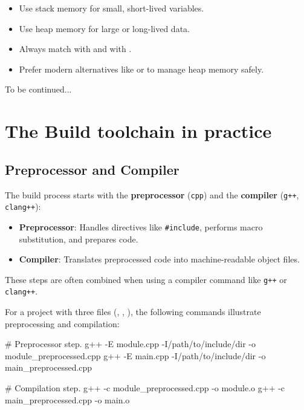\begin{tipsblock}
    \begin{itemize}
        \item Use stack memory for small, short-lived variables.
        \item Use heap memory for large or long-lived data.
        \item Always match  with  and  with .
        \item Prefer modern alternatives like  or  to manage heap memory safely.
    \end{itemize}
\end{tipsblock}

\Large To be continued... \normalsize

\newpage

\section{The Build toolchain in practice}

\subsection{Preprocessor and Compiler}

The build process starts with the \textbf{preprocessor} (\texttt{cpp}) and the \textbf{compiler} (\texttt{g++}, \texttt{clang++}):
\begin{itemize}
    \item \textbf{Preprocessor}: Handles directives like \texttt{\#include}, performs macro substitution, and prepares code.
    \item \textbf{Compiler}: Translates preprocessed code into machine-readable object files.
    \end{itemize}

These steps are often combined when using a compiler command like \texttt{g++} or \texttt{clang++}.

\begin{exampleblock}
    For a project with three files (, , ), the following commands illustrate preprocessing and compilation:
    
    \begin{codeblock}[language=bash, numbers=none]
# Preprocessor step.
g++ -E module.cpp -I/path/to/include/dir -o module_preprocessed.cpp
g++ -E main.cpp -I/path/to/include/dir -o main_preprocessed.cpp

# Compilation step.
g++ -c module_preprocessed.cpp -o module.o
g++ -c main_preprocessed.cpp -o main.o
    \end{codeblock}
\end{exampleblock}

